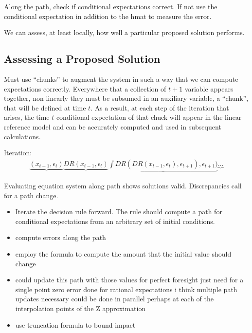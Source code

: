 \documentclass[12pt]{article}
\begin{document}
Along the path, check if conditional expectations correct.  If not use the conditional expectation in addition to the hmat to measure the error.

We can assess, at least locally, 
how well a particular proposed solution performs.

\subsection{Assessing a Proposed Solution}
\label{sec:decis-rule-assessm}

Must use ``chunks'' to augment the system in such a way that we
can compute expectations correctly.
Everywhere that a collection of 
$t+1$ variable appears together, non linearly they must be subsumed in an
auxiliary variable, a ``chunk'', 
that will be defined at time $t$.  As a result, at each step
of the iteration that arises, the time $t$
conditional expectation of that chuck will appear in the 
linear reference model and can be accurately computed and
used in subsequent calculations.


Iteration:
\begin{gather}
\underbrace{(x_{t-1},\epsilon_t)} 
\underbrace{DR(x_{t-1},\epsilon_t)}
\underbrace{\int DR(DR(x_{t-1},\epsilon_t),\epsilon_{t+1}),\epsilon_{t+1})}
\underbrace{\ldots}
\end{gather}

Evaluating equation system along path shows solutions valid. Discrepancies call for a path change.

\label{sec:assess}
\begin{itemize}
\item Iterate the decision rule forward.  The rule should compute a path for conditional expectations from an arbitrary set of initial conditions.
\item compute errors along the path
\item employ the formula to compute the amount that the initial value should change
\item could update this path with those values for perfect foresight
just need for a single point zero error done for rational expectations 
i think multiple path updates necessary could be done in parallel perhaps at each of the interpolation points of the Z approximation
\item use truncation formula to bound impact
\end{itemize}
\end{document}
